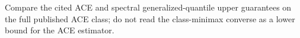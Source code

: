 Compare the cited ACE and spectral generalized-quantile upper guarantees on the full published ACE class; do not read the class-minimax converse as a lower bound for the ACE estimator.